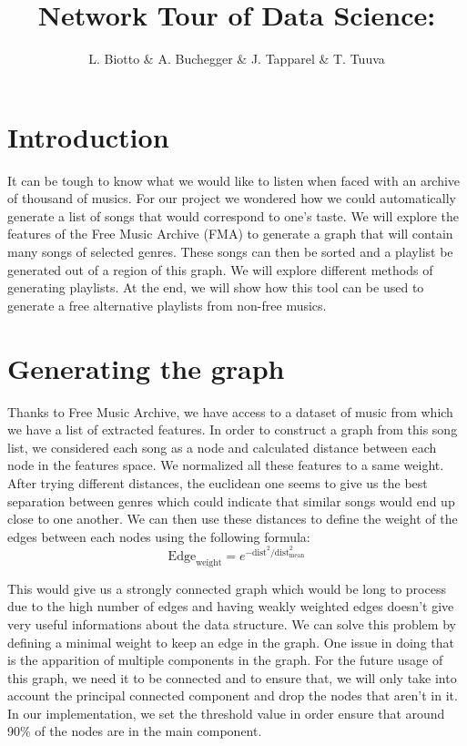 \documentclass[11pt,a4paper,twoside]{article}
\title{\textbf{\huge{Network Tour of Data Science: }}\\\vspace{0.5cm}\normalfont{Free Music Alternative Playlists}}
\author{\LARGE{L. Biotto \& A. Buchegger \& J. Tapparel \& T. Tuuva}}
\date{}
\begin{document}
\maketitle

\section{Introduction}

It can be tough to know what we would like to listen when faced with an archive of thousand of musics. For our project we wondered how we could automatically generate a list of songs that would correspond to one's taste. We will explore the features of the Free Music Archive (FMA) to generate a graph that will contain many songs of selected genres. These songs can then be sorted and a playlist be generated out of a region of this graph. We will explore different methods of generating playlists. At the end, we will show how this tool can be used to generate a free alternative playlists from non-free musics.

\section{Generating the graph}
Thanks to Free Music Archive, we have access to a dataset of music from which we have a list of extracted features. In order to construct a graph from this song list, we considered each song as a node and calculated distance between each node in the features space. We normalized all these features to a same weight. After trying different distances, the euclidean one seems to give us the best separation between genres which could indicate that similar songs would end up close to one another. We can then use these distances to define the weight of the edges between each nodes using the following formula:
$$
\text{Edge}_{\text{weight}}=e^{-\text{dist}^2/\text{dist}_{\text{mean}}^2}
$$

This would give us a strongly connected graph which would be long to process due to the high number of edges and having weakly weighted edges doesn't give very useful informations about the data structure. We can solve this problem by defining a minimal weight to keep an edge in the graph. One issue in doing that is the apparition of multiple components in the graph. For the future usage of this graph, we need it to be connected and to ensure that, we will only take into account the principal connected component and drop the nodes that aren't in it. In our implementation, we set the threshold value in order ensure that around 90\% of the nodes are in the main component.\\
\end{document}
